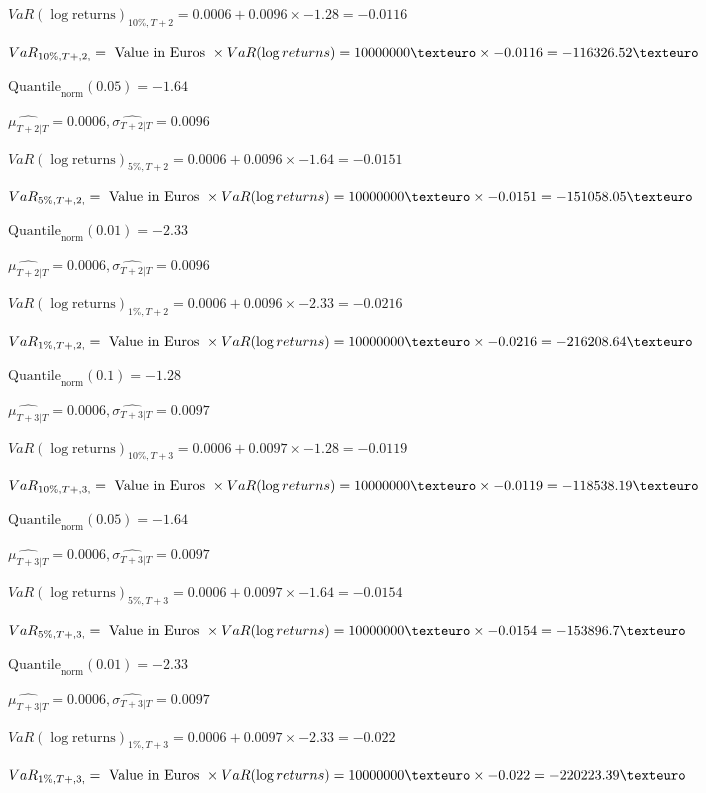 $VaR(\log \text{returns})_{10\%, T + 2} = 0.0006 + 0.0096\times-1.28 = -0.0116$

$VaR_{10\%, T + ,2,} = \text{ Value in Euros } \times VaR(\log returns) = 10 000 000 \texteuro \times-0.0116 = -116326.52 \texteuro$


$\text{Quantile}_\text{norm}(0.05) = -1.64$

$\hat{\mu_{T+2|T}} = 0.0006, \hat{\sigma_{T+2|T}} = 0.0096$

$VaR(\log \text{returns})_{5\%, T + 2} = 0.0006 + 0.0096\times-1.64 = -0.0151$

$VaR_{5\%, T + ,2,} = \text{ Value in Euros } \times VaR(\log returns) = 10 000 000 \texteuro \times-0.0151 = -151058.05 \texteuro$


$\text{Quantile}_\text{norm}(0.01) = -2.33$

$\hat{\mu_{T+2|T}} = 0.0006, \hat{\sigma_{T+2|T}} = 0.0096$

$VaR(\log \text{returns})_{1\%, T + 2} = 0.0006 + 0.0096\times-2.33 = -0.0216$

$VaR_{1\%, T + ,2,} = \text{ Value in Euros } \times VaR(\log returns) = 10 000 000 \texteuro \times-0.0216 = -216208.64 \texteuro$


$\text{Quantile}_\text{norm}(0.1) = -1.28$

$\hat{\mu_{T+3|T}} = 0.0006, \hat{\sigma_{T+3|T}} = 0.0097$

$VaR(\log \text{returns})_{10\%, T + 3} = 0.0006 + 0.0097\times-1.28 = -0.0119$

$VaR_{10\%, T + ,3,} = \text{ Value in Euros } \times VaR(\log returns) = 10 000 000 \texteuro \times-0.0119 = -118538.19 \texteuro$


$\text{Quantile}_\text{norm}(0.05) = -1.64$

$\hat{\mu_{T+3|T}} = 0.0006, \hat{\sigma_{T+3|T}} = 0.0097$

$VaR(\log \text{returns})_{5\%, T + 3} = 0.0006 + 0.0097\times-1.64 = -0.0154$

$VaR_{5\%, T + ,3,} = \text{ Value in Euros } \times VaR(\log returns) = 10 000 000 \texteuro \times-0.0154 = -153896.7 \texteuro$


$\text{Quantile}_\text{norm}(0.01) = -2.33$

$\hat{\mu_{T+3|T}} = 0.0006, \hat{\sigma_{T+3|T}} = 0.0097$

$VaR(\log \text{returns})_{1\%, T + 3} = 0.0006 + 0.0097\times-2.33 = -0.022$

$VaR_{1\%, T + ,3,} = \text{ Value in Euros } \times VaR(\log returns) = 10 000 000 \texteuro \times-0.022 = -220223.39 \texteuro$


